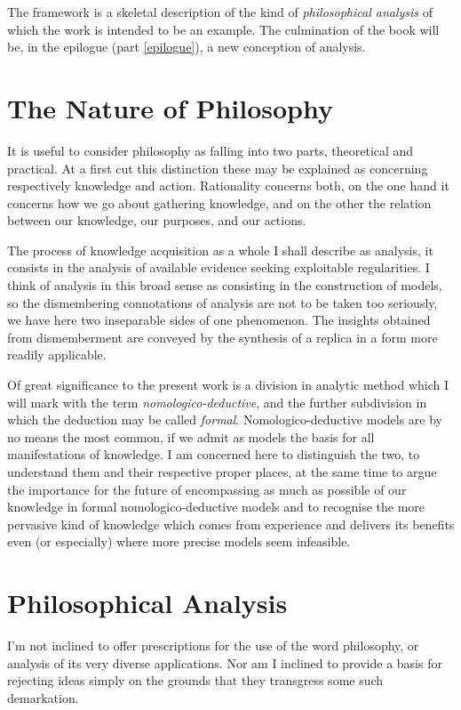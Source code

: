 The framework is a skeletal description of the kind of \emph{philosophical analysis} of which the work is intended to be an example.
The culmination of the book will be, in the epilogue (part \ref{epilogue}), a new conception of analysis.

\chapter{The Nature of Philosophy}

It is useful to consider philosophy as falling into two parts, theoretical and practical.
At a first cut this distinction these may be explained as concerning respectively knowledge and action.
Rationality concerns both, on the one hand it concerns how we go about gathering knowledge, and on the other the relation between our knowledge, our purposes, and our actions.

The process of knowledge acquisition as a whole I shall describe as analysis, it consists in the analysis of available evidence seeking exploitable regularities.
I think of analysis in this broad sense as consisting in the construction of models, so the dismembering connotations of analysis are not to be taken too seriously, we have here two inseparable sides of one phenomenon.
The insights obtained from dismemberment are conveyed by the synthesis of a replica in a form more readily applicable.

Of great significance to the present work is a division in analytic method which I will mark with the term \emph{nomologico-deductive}, and the further subdivision in which the deduction may be called \emph{formal}.
Nomologico-deductive models are by no means the most common, if we admit as models the basis for all manifestations of knowledge.
I am concerned here to distinguish the two, to understand them and their respective proper places, at the same time to argue the importance for the future of encompassing as much as possible of our knowledge in formal nomologico-deductive models and to recognise the more pervasive kind of knowledge which comes from experience and delivers its benefits even (or especially) where more precise models seem infeasible.

\chapter{Philosophical Analysis}

I'm not inclined to offer prescriptions for the use of the word philosophy, or analysis of its very diverse applications.
Nor am I inclined to provide a basis for rejecting ideas simply on the grounds that they transgress some such demarkation.


